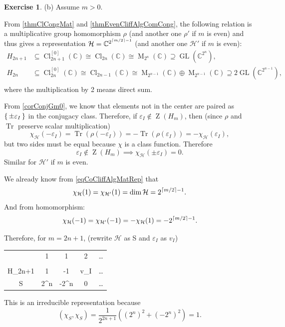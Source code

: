 \documentclass[12pt, letterpaper]{article}
\newcommand{\co}{\mathbb{C}}
\newcommand{\GL}{\operatorname{GL}}
\newcommand{\MM}{\operatorname{M}}
\newcommand{\ZZ}{\operatorname{Z}}
\newcommand{\Tr}{\operatorname{Tr}}
\newcommand{\Cl}{\operatorname{Cl}}
\DeclarePairedDelimiter\ceil{\lceil}{\rceil}
\theoremstyle{definition}
\theoremstyle{remark}
\theoremstyle{definition}
\newtheorem{exe}{Exercise}[section]
\theoremstyle{plain}
\numberwithin{equation}{section}
\begin{document}
	\begin{exe}\label{exe3.9}
		(b)
		Assume $m>0$.
		
		From \autoref{thmClCongMat} and \autoref{thmEvenCliffAlgComCong}, 
		the following relation is a multiplicative group homomorphism $\rho$ (and another one $\rho'$ if $m$ is even)
		and thus gives a representation $\mathcal{H}=\co^{2^{\ceil{m/2}-1}}$ (and another one $\mathcal{H}'$ if $m$ is even):
		\[
		\begin{aligned}
			H_{2n+1}&\subseteq\Cl_{2n+1}^{[0]}(\co)\cong\Cl_{2n}(\co)\cong\MM_{2^n}(\co)\supseteq \GL(\co^{2^n}),\\
			H_{2n}&\subseteq\Cl_{2n}^{[0]}(\co)\cong\Cl_{2n-1}(\co)\cong\MM_{2^{n-1}}(\co)\oplus\MM_{2^{n-1}}(\co)\supseteq2\GL(\co^{2^{n-1}}),\\
		\end{aligned}
		\]
		where the multiplication by 2 means direct sum.
		
		From \autoref{corConjGm0}, we know that elements not in the center are paired as
		$\set{\pm \varepsilon_I}$ in the conjugacy class. Therefore, if $\varepsilon_I\notin \ZZ(H_m)$, then
		(since $\rho$ and $\Tr$ preserve scalar multiplication)
		\[\chi_{\mathcal{H}}(-\varepsilon_I)=\Tr(\rho(-\varepsilon_I))=-\Tr(\rho(\varepsilon_I))=-\chi_{\mathcal{H}}(\varepsilon_I), \]
		but two sides must be equal because $\chi$ is a class function.
		Therefore \[\varepsilon_I\notin \ZZ(H_m)\implies\chi_{\mathcal{H}}(\pm\varepsilon_I)=0.\]
		Similar for $\mathcal{H'}$ if $m$ is even.
		
		We already know from \eqref{eqCoCliffAlgMatRep} that
		\[\chi_{\mathcal{H}}(1)=\chi_{\mathcal{H}'}(1)=\dim \mathcal{H}=2^{\ceil{m/2}-1} .\]
		And from homomorphism:
		\[\chi_{\mathcal{H}}(-1) =\chi_{\mathcal{H}'}(-1)=-\chi_{\mathcal{H}}(1)=-2^{\ceil{m/2}-1} .\]
		
		Therefore, for $m=2n+1$, (rewrite $\mathcal{H}$ as S and $\varepsilon_I$ as $v_I$)
		\begin{center}
			\begin{tabular}{C | C C C C}
				& 1 & 1 & 2 & \dots \\
				\\
				H_{2n+1}& 1 & -1 & \pm v_I & \dots\\
				\hline
				S & 2^n & -2^n & 0 & \dots\\ 
			\end{tabular}
		\end{center}
	
		This is an irreducible representation because 
		\[(\chi_S,\chi_S)=\frac{1}{2^{2n+1}}((2^n)^2+(-2^n)^2)=1.\]
		

\end{exe}
\end{document}
